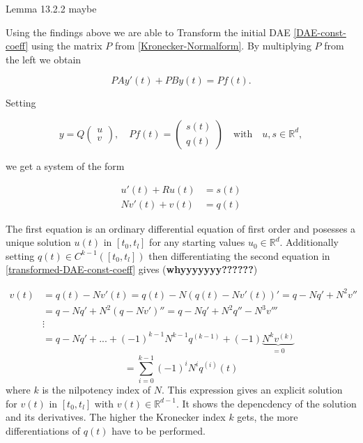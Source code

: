 Lemma 13.2.2 maybe

Using the findings above we are able to Transform the initial DAE \ref{DAE-const-coeff} using the matrix $P$ from \ref{Kronecker-Normalform}. By multiplying $P$ from the left we obtain

\begin{displaymath}
	P A y'(t) + P B y(t) = P f(t) .
\end{displaymath}

Setting

\begin{displaymath}
	y = Q
	\left(
	\begin{matrix}
		u \\
		v
	\end{matrix}  
	\right) 
	, \quad
	Pf(t) = 
	\left(
	\begin{matrix}
		s(t) \\
		q(t)
	\end{matrix}
	\right)
	\quad \text{with} \quad
	u,s \in \mathbb{R}^d ,
\end{displaymath}

we get a system of the form

\begin{equation}
	\label{transformed-DAE-const-coeff}
	\begin{aligned}
		u'(t) + Ru(t) &= s(t) \\
		Nv'(t) + v(t) &= q(t)
	\end{aligned}
\end{equation}

The first equation is an ordinary differential equation of first order and posesses a unique solution $u(t)$ in $[t_0,t_l]$ for any starting values $u_0 \in \mathbb{R}^d$. Additionally setting $q(t) \in C^{k-1}([t_0,t_l])$ then differentiating the second equation in \ref{transformed-DAE-const-coeff} gives (\textbf{whyyyyyyy??????})

\begin{displaymath}
	\begin{aligned}
		v(t) &= q(t) - Nv'(t) = q(t) - N(q(t)-Nv'(t))' = q-Nq'+N^2v'' \\
		&= q-Nq'+N^2(q-Nv')'' = q-Nq'+N^2q''-N^3v''' \\
		&\vdots \\
		&= q-Nq'+...+(-1)^{k-1}N^{k-1}q^{(k-1)}+(-1) \underbrace{N^kv^{(k)}}_{=0}
	\end{aligned}
\end{displaymath}
\begin{equation}
	\label{solution-to-transformed-DAE-const-coeff-part2}
	= \sum_{i=0}^{k-1} (-1)^iN^iq^{(i)}(t) 
\end{equation}
where $k$ is the nilpotency index of $N$. This expression gives an explicit solution for $v(t)$ in $[t_0,t_l]$ with $v(t) \in \mathbb{R}^{d-1}$. It shows the depencdency of the solution and its derivatives. The higher the Kronecker index $k$ gets, the more differentiations of $q(t)$ have to be performed.

